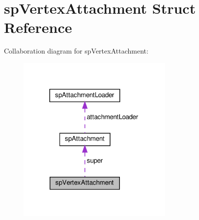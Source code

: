 \hypertarget{structspVertexAttachment}{}\section{sp\+Vertex\+Attachment Struct Reference}
\label{structspVertexAttachment}


Collaboration diagram for sp\+Vertex\+Attachment\+:
\nopagebreak
\begin{figure}[H]
\begin{center}
\leavevmode
\includegraphics[width=216pt]{structspVertexAttachment__coll__graph}
\end{center}
\end{figure}
